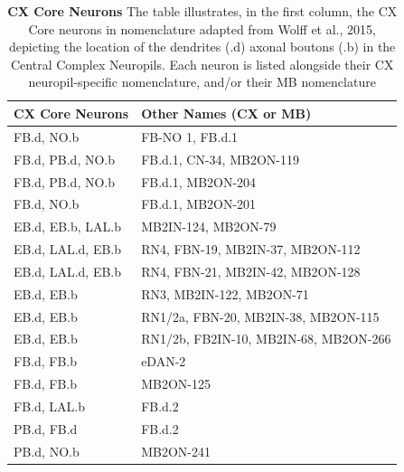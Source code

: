          \begin{table}[H]
            \centering
            \begin{tabular}{|l|l|}
            \hline
            \textbf{CX Core Neurons} & \textbf{Other Names (CX or MB)} \\
            \hline
            FB.d, NO.b & FB-NO 1, FB.d.1 \\
            FB.d, PB.d, NO.b & FB.d.1, CN-34, MB2ON-119 \\
            FB.d, PB.d, NO.b & FB.d.1, MB2ON-204 \\
            FB.d, NO.b & FB.d.1, MB2ON-201 \\
            EB.d, EB.b, LAL.b & MB2IN-124, MB2ON-79 \\
            EB.d, LAL.d, EB.b & RN4, FBN-19, MB2IN-37, MB2ON-112 \\
            EB.d, LAL.d, EB.b & RN4, FBN-21, MB2IN-42, MB2ON-128 \\
            EB.d, EB.b & RN3, MB2IN-122, MB2ON-71 \\
            EB.d, EB.b & RN1/2a, FBN-20, MB2IN-38, MB2ON-115 \\
            EB.d, EB.b & RN1/2b, FB2IN-10, MB2IN-68, MB2ON-266 \\
            FB.d, FB.b & eDAN-2 \\
            FB.d, FB.b & MB2ON-125 \\
            FB.d, LAL.b & FB.d.2 \\
            PB.d, FB.d & FB.d.2 \\
            PB.d, NO.b & MB2ON-241 \\
            \hline
            \end{tabular}
            \caption[CX Core Neurons]{\textbf{CX Core Neurons} The table illustrates, in the first column, the CX Core neurons in nomenclature adapted from Wolff et al., 2015\citep{wolff2018neuroarchitecture}, depicting the location of the dendrites (.d) axonal boutons (.b) in the Central Complex Neuropils. Each neuron is listed alongside their CX neuropil-specific nomenclature, and/or their MB nomenclature}
            \label{CXCoreNeurons}
            \end{table}
        
